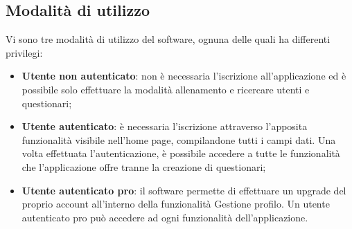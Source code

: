 \subsection{Modalità di utilizzo}
Vi sono tre modalità di utilizzo del software, ognuna delle quali ha differenti privilegi:
\begin{itemize}
	\item \textbf{Utente non autenticato}: non è necessaria l'iscrizione all'applicazione ed è possibile solo effettuare la modalità allenamento e ricercare utenti e questionari;
	\item \textbf{Utente autenticato}: è necessaria l'iscrizione attraverso l'apposita funzionalità visibile nell'home page, compilandone tutti i campi dati. Una volta effettuata l'autenticazione, è possibile accedere a tutte le funzionalità che l'applicazione offre tranne la creazione di questionari;
	\item \textbf{Utente autenticato pro}: il software permette di effettuare un upgrade del proprio account all'interno della funzionalità Gestione profilo. Un utente autenticato pro può accedere ad ogni funzionalità dell'applicazione. 
\end{itemize}

